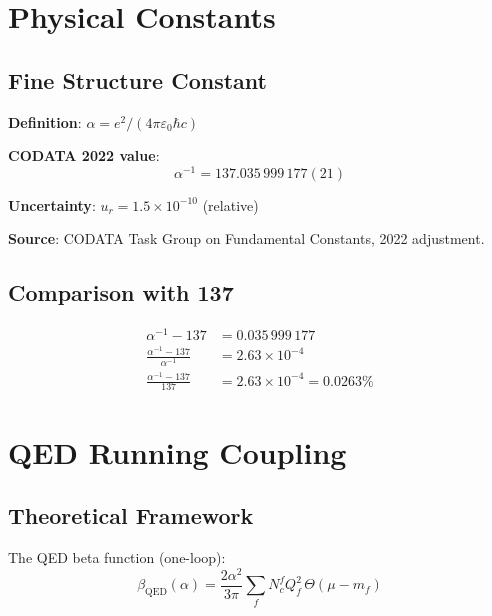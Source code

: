 \documentclass[11pt,a4paper]{article}
\begin{document}
\section{Physical Constants}

\subsection{Fine Structure Constant}

\textbf{Definition}: $\alpha = e^2 / (4\pi\varepsilon_0 \hbar c)$

\textbf{CODATA 2022 value}:
\begin{equation}
\alpha^{-1} = 137.035\,999\,177(21)
\end{equation}

\textbf{Uncertainty}: $u_r = 1.5 \times 10^{-10}$ (relative)

\textbf{Source}: CODATA Task Group on Fundamental Constants, 2022 adjustment.

\subsection{Comparison with 137}

\begin{align}
\alpha^{-1} - 137 &= 0.035\,999\,177 \\
\frac{\alpha^{-1} - 137}{\alpha^{-1}} &= 2.63 \times 10^{-4} \\
\frac{\alpha^{-1} - 137}{137} &= 2.63 \times 10^{-4} = 0.0263\%
\end{align}

\section{QED Running Coupling}

\subsection{Theoretical Framework}

The QED beta function (one-loop):
\begin{equation}
\beta_{\text{QED}}(\alpha) = \frac{2\alpha^2}{3\pi} \sum_f N_c^f Q_f^2 \, \Theta(\mu - m_f)
\end{equation}
\end{document}
